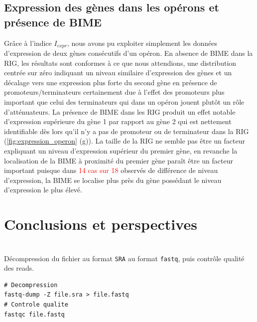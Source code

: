 \documentclass[12pt,a4paper]{report}
\begin{document}
\begin{onehalfspace}
\section*{Expression des gènes dans les opérons et présence de BIME}
Grâce à l'indice $I_{expr}$, nous avons pu exploiter simplement les données d'expression de deux gènes consécutifs d'un opéron. En absence de BIME dans la RIG, les résultats sont conformes à ce que nous attendions, une distribution centrée sur zéro indiquant un niveau similaire d'expression des gènes et un décalage vers une expression plus forte du second gène en présence de promoteurs/terminateurs certainement due à l'effet des promoteurs plus important que celui des terminateurs qui dans un opéron jouent plutôt un rôle d'atténuateurs. La présence de BIME dans les RIG produit un effet notable d'expression supérieure du gène 1 par rapport au gène 2 qui est nettement identifiable dès lors qu'il n'y a pas de promoteur ou de terminateur dans la RIG (\autoref{fig:expression_operon} (g)). La taille de la RIG ne semble pas être un facteur expliquant un niveau d'expression supérieur du premier gène, en revanche la localisation de la BIME à proximité du premier gène paraît être un facteur important puisque dans \textcolor{red}{14 cas sur 18} observés de différence de niveau d'expression, la BIME se localise plus près du gène possédant le niveau d'expression le plus élevé.




\chapter*{Conclusions et perspectives}

\end{onehalfspace}


\renewcommand{\thepage}{}
\printglossary[type=\acronymtype ,title=Glossaire]

%


\appendix

\chapter{}
\label{annexeCode}

Décompression du fichier au format \texttt{SRA} au format \texttt{fastq}, puis contrôle qualité des reads.
\begin{lstlisting}[frame=single]
# Decompression
fastq-dump -Z file.sra > file.fastq
# Controle qualite
fastqc file.fastq
\end{lstlisting}
\end{document}
